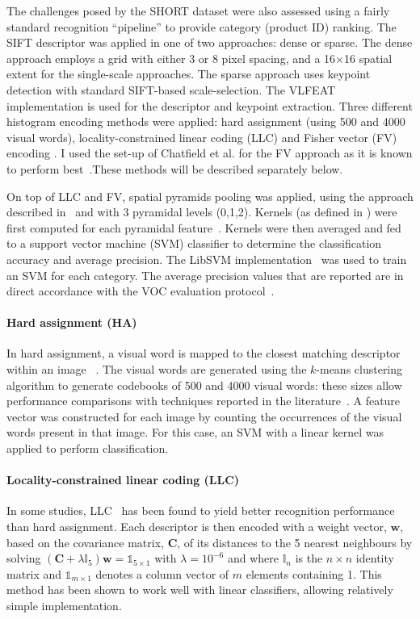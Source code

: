 The challenges posed by the SHORT dataset were also assessed using a fairly standard recognition ``pipeline'' to provide category (product ID) ranking. The SIFT descriptor was applied in one of two approaches: dense or sparse. The dense approach employs a grid with either 3 or 8 pixel spacing, and a 16$\times$16 spatial extent for the single-scale approaches. The sparse approach uses keypoint detection with standard SIFT-based scale-selection. The VLFEAT implementation is used for the descriptor and keypoint extraction. Three different histogram encoding methods were applied: hard assignment \cite{Csurka2004} (using 500 and 4000 visual words), locality-constrained linear coding (LLC) \cite{Wang2010} and Fisher vector (FV) encoding \cite{Perronnin2010}. I used the set-up of Chatfield et al. for the FV approach as it is known to perform best~\cite{Chatfield2011}.These methods will be described separately below. 

On top of LLC and FV, spatial pyramids pooling was applied, using the approach described in~\cite{Lazebnik2006} and with 3 pyramidal levels (0,1,2). Kernels (as defined in \cite{vedaldi2012efficient}) were first computed for each pyramidal feature~\cite{VanDeSande2010}. Kernels were then averaged and fed to a support vector machine (SVM) classifier to determine the classification accuracy and average precision. The LibSVM implementation~\cite{CC01a} was used to train an SVM for each category. The average precision values that are reported are in direct accordance with the VOC evaluation protocol~\cite{Everingham2009}. 

\paragraph{Hard assignment (HA)} 
In hard assignment, a visual word is mapped to the closest matching descriptor within an image ~\cite{Csurka2004}. The visual words are generated using the $k$-means clustering algorithm to generate codebooks of 500 and 4000 visual words: these sizes allow performance comparisons with techniques reported in the literature~\cite{Chatfield2011}. A feature vector was constructed for each image by counting the occurrences of the visual words present in that image. For this case, an SVM with a linear kernel was applied to perform classification. 

\paragraph{Locality-constrained linear coding (LLC)} 
In some studies, LLC~\cite{Wang2010} has been found to yield better recognition performance than hard assignment. Each descriptor is then encoded with a weight vector, $\mathbf{w}$, based on the covariance matrix, $\mathbf{C}$, of its distances to the 5 nearest neighbours by solving $(\mathbf{C} + \lambda \mathbb{I}_{5})\mathbf{w} = \mathds{1}_{5\times 1}$ with $\lambda=10^{-6}$ and where $\mathbb{I}_n$ is the $n\times n$ identity matrix and $\mathds{1}_{m\times 1}$ denotes a column vector of $m$ elements containing 1. This method has been shown to work well with linear classifiers, allowing relatively simple implementation.


